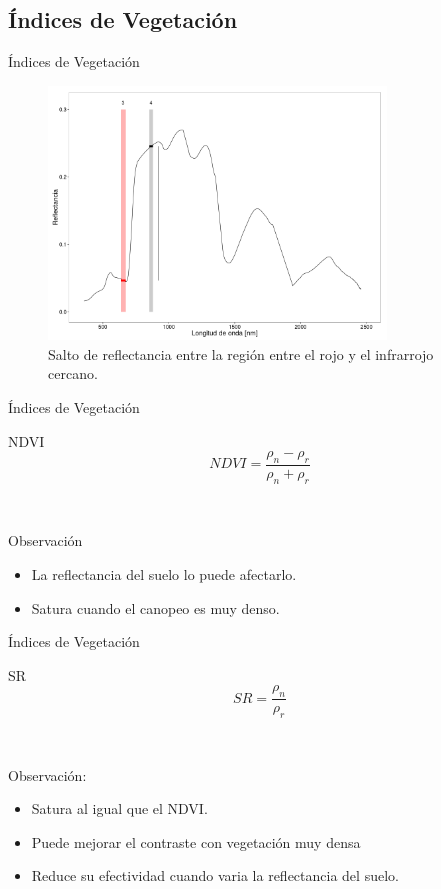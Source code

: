 \documentclass[handout]{beamer}
\begin{document}
\subsection{Índices de Vegetación}

\begin{frame}{Índices de Vegetación}
    \begin{figure}
    \centering
    \includegraphics[width=0.8\textwidth]{imagenes/salto_nr.png}
    \caption{Salto de reflectancia entre la región entre el rojo y el infrarrojo cercano.}
    \end{figure}
\end{frame}
\begin{frame}{Índices de Vegetación}
  \begin{block}{NDVI}
      \begin{equation}
          NDVI = \frac{\rho_n-\rho_r}{\rho_n+\rho_r} 
      \end{equation}
  \end{block}\pause\
    \begin{block}{Observación}
        \begin{itemize}[<+->]
            \item La reflectancia del suelo lo puede afectarlo.
            \item Satura cuando el canopeo es muy denso.
        \end{itemize}
    \end{block}
\end{frame}

\begin{frame}{Índices de Vegetación}
  \begin{block}{SR}
     $$SR=\frac{\rho_n}{\rho_r}$$
  \end{block}\pause\
  \begin{block}{Observación:}
      \begin{itemize}[<+->]
        \item Satura al igual que el NDVI\@.
        \item Puede mejorar el contraste con vegetación muy densa
        \item Reduce su efectividad cuando varia la reflectancia del suelo.
    \end{itemize}
  \end{block}
\end{frame}
\end{document}
